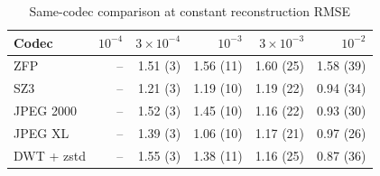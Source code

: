 \begin{table}[t]
\centering
\caption{Same-codec comparison at constant reconstruction RMSE}
\label{tab:fixed_codec}
\footnotesize
\setlength{\tabcolsep}{3pt}
\begin{tabular}{lrrrrr}
\toprule
Codec & $10^{-4}$ & $3\times10^{-4}$ & $10^{-3}$ & $3\times10^{-3}$ & $10^{-2}$ \\
\midrule
ZFP & -- & 1.51 (3) & 1.56 (11) & 1.60 (25) & 1.58 (39) \\
SZ3 & -- & 1.21 (3) & 1.19 (10) & 1.19 (22) & 0.94 (34) \\
JPEG 2000 & -- & 1.52 (3) & 1.45 (10) & 1.16 (22) & 0.93 (30) \\
JPEG XL & -- & 1.39 (3) & 1.06 (10) & 1.17 (21) & 0.97 (26) \\
DWT + zstd & -- & 1.55 (3) & 1.38 (11) & 1.16 (25) & 0.87 (36) \\
\bottomrule
\end{tabular}
\end{table}
